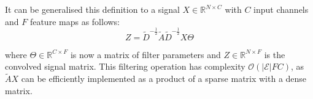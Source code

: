 \documentclass{article}
\begin{document}
It can be generalised this definition to a signal $X \in \mathbb{R}^{N \times
C}$ with $C$ input channels and $F$ feature maps as follows:
\begin{equation}
  Z = \tilde{D}^{-\frac{1}{2}}\tilde{A}\tilde{D}^{-\frac{1}{2}}X\Theta
  \label{eq:5}
\end{equation}

where $\Theta \in \mathbb{R}^{C \times F}$ is now a matrix of filter parameters
and $Z \in \mathbb{R}^{N \times F}$ is the convolved signal matrix. This
filtering operation has complexity $\mathcal{O}(\vert \mathcal{E}\vert FC)$, as
$\tilde{A}X$ can be efficiently implemented as a product of a sparse matrix
with a dense matrix.
\end{document}
